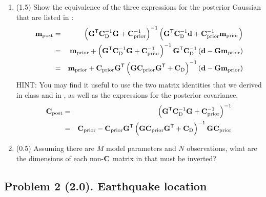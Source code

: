 \documentclass[11pt,titlepage,fleqn]{article}
\begin{document}
\begin{enumerate}
\item (1.5) Show the equivalence of the three expressions for the posterior Gaussian that are listed in \citet[][p.~66]{Tarantola2005}:
%
\begin{eqnarray}
\mpost &=& \left(\bG^{\tssT} \covdi \bG + \cpriori \right)^{-1}
\left( \bG^{\tssT} \covdi \bd + \cpriori\mprior \right)
\label{mpost1}
\\
&=& \mprior + \left(\bG^{\tssT} \covdi \bG + \cpriori \right)^{-1} \bG^{\tssT} \covdi \left( \bd - \bG \mprior\right)
\label{mpost2}
\\
&=& \mprior + \cprior \bG^{\tssT} \left( \bG \cprior \bG^{\tssT} + \Cd\right)^{-1} \left( \bd - \bG \mprior\right)
\label{mpost3}
\end{eqnarray}
%
HINT: You may find it useful to use the two matrix identities that we derived in class and in \citet[][Eq.~6.525]{Tarantola2005}, as well as the expressions for the posterior covariance,
%
\begin{eqnarray}
\cpost &=& \left(\bG^{\tssT} \covdi \bG + \cpriori \right)^{-1}
\label{cpost1}
\\
&=& \cprior - \cprior \bG^{\tssT} \left( \bG \cprior \bG^{\tssT} + \covd \right)^{-1} \bG \cprior
\label{cpost2}
\end{eqnarray}

\item (0.5) Assuming there are $M$ model parameters and $N$ observations, what are the dimensions of each non-$\mbox{${\bf C}$}$ matrix in  that must be inverted?
\end{enumerate}


\pagebreak
\subsection*{Problem 2 (2.0). Earthquake location}
\end{document}
